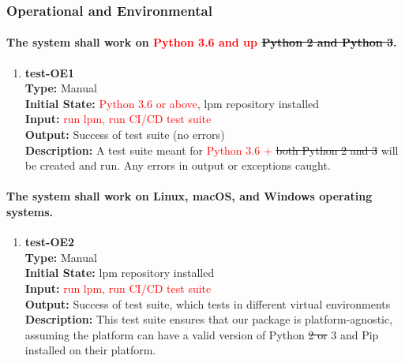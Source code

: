 \documentclass[12pt, titlepage]{article}
\begin{document}
\subsubsection{Operational and Environmental}
\paragraph{The system shall work on \textcolor{red}{Python 3.6 and up} \sout{Python 2 and Python 3}.}
\begin{enumerate}
    \item{\textbf{test-OE1}\\}
    \textbf{Type:} Manual\\
    \textbf{Initial State:} \textcolor{red}{Python 3.6 or above}, lpm repository installed\\
    \textbf{Input:} \textcolor{red}{run lpm, run CI/CD test suite}\\
    \textbf{Output:} Success of test suite (no errors)\\
    \textbf{Description:} A test suite meant for \textcolor{red}{Python 3.6 +} \sout{both Python 2 and 3} will be created and run. Any errors in output or exceptions caught.\\
\end{enumerate}

\paragraph{The system shall work on Linux, macOS, and Windows operating systems.}
\begin{enumerate}
    \item{\textbf{test-OE2}\\}
    \textbf{Type:} Manual\\
    \textbf{Initial State:} lpm repository installed\\
    \textbf{Input:} \textcolor{red}{run lpm, run CI/CD test suite}\\
    \textbf{Output:} Success of test suite, which tests in different virtual environments\\
    \textbf{Description:} This test suite ensures that our package is platform-agnostic, assuming the platform can have a valid version of Python \sout{2 or} 3 and Pip installed on their platform.\\
\end{enumerate}
\end{document}
